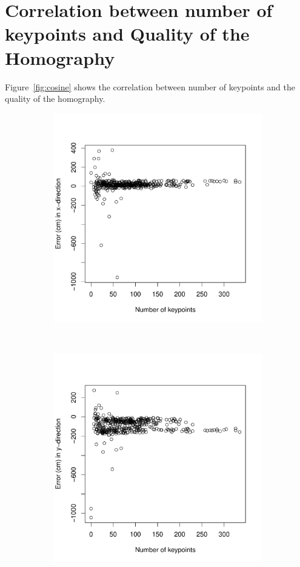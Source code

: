 \documentclass[11pt]{report}
\begin{document}
\section{Correlation between number of keypoints and Quality of the
  Homography}

Figure~\ref{fig:cosine} shows the correlation between number of
keypoints and the quality of the homography.

\begin{figure}
  \label{fig:cor_keypoints}
  \centering
  \begin{subfigure}[b]{0.5\textwidth}
  \includegraphics[width=1\textwidth]{keypoints_error_x1}
  \label{fig:cosinesim}
  \end{subfigure}%
~
  \begin{subfigure}[b]{0.5\textwidth}
  \includegraphics[width=1\textwidth]{keypoints_error_y}

\end{subfigure}
\end{figure}
\end{document}
